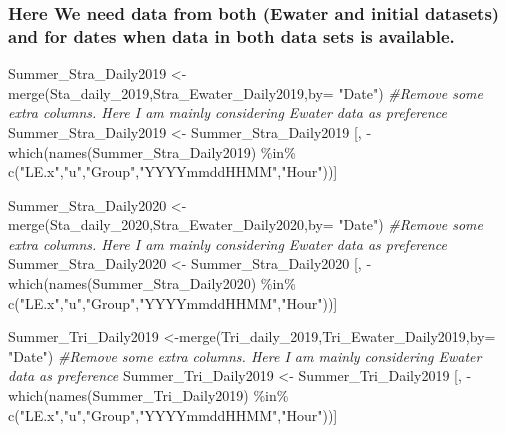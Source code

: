 \documentclass[
]{article}
\newenvironment{Shaded}{\begin{snugshade}}{\end{snugshade}}
\newcommand{\AttributeTok}[1]{\textcolor[rgb]{0.77,0.63,0.00}{#1}}
\newcommand{\CommentTok}[1]{\textcolor[rgb]{0.56,0.35,0.01}{\textit{#1}}}
\newcommand{\FunctionTok}[1]{\textcolor[rgb]{0.00,0.00,0.00}{#1}}
\newcommand{\NormalTok}[1]{#1}
\newcommand{\OtherTok}[1]{\textcolor[rgb]{0.56,0.35,0.01}{#1}}
\newcommand{\SpecialCharTok}[1]{\textcolor[rgb]{0.00,0.00,0.00}{#1}}
\newcommand{\StringTok}[1]{\textcolor[rgb]{0.31,0.60,0.02}{#1}}
\begin{document}
\hypertarget{here-we-need-data-from-both-ewater-and-initial-datasets-and-for-dates-when-data-in-both-data-sets-is-available.}{%
\subsubsection{Here We need data from both (Ewater and initial datasets)
and for dates when data in both data sets is
available.}\label{here-we-need-data-from-both-ewater-and-initial-datasets-and-for-dates-when-data-in-both-data-sets-is-available.}}

\begin{Shaded}
\begin{Highlighting}[]
\NormalTok{Summer\_Stra\_Daily2019 }\OtherTok{\textless{}{-}}\FunctionTok{merge}\NormalTok{(Sta\_daily\_2019,Stra\_Ewater\_Daily2019,}\AttributeTok{by=} \StringTok{"Date"}\NormalTok{)}
\CommentTok{\#Remove some extra columns. Here I am mainly considering Ewater data as preference}
\NormalTok{Summer\_Stra\_Daily2019 }\OtherTok{\textless{}{-}}\NormalTok{ Summer\_Stra\_Daily2019 [, }\SpecialCharTok{{-}}\FunctionTok{which}\NormalTok{(}\FunctionTok{names}\NormalTok{(Summer\_Stra\_Daily2019) }\SpecialCharTok{\%in\%} \FunctionTok{c}\NormalTok{(}\StringTok{"LE.x"}\NormalTok{,}\StringTok{"u"}\NormalTok{,}\StringTok{"Group"}\NormalTok{,}\StringTok{"YYYYmmddHHMM"}\NormalTok{,}\StringTok{"Hour"}\NormalTok{))]}

\NormalTok{Summer\_Stra\_Daily2020 }\OtherTok{\textless{}{-}}\FunctionTok{merge}\NormalTok{(Sta\_daily\_2020,Stra\_Ewater\_Daily2020,}\AttributeTok{by=} \StringTok{"Date"}\NormalTok{)}
\CommentTok{\#Remove some extra columns. Here I am mainly considering Ewater data as preference}
\NormalTok{Summer\_Stra\_Daily2020 }\OtherTok{\textless{}{-}}\NormalTok{ Summer\_Stra\_Daily2020 [, }\SpecialCharTok{{-}}\FunctionTok{which}\NormalTok{(}\FunctionTok{names}\NormalTok{(Summer\_Stra\_Daily2020) }\SpecialCharTok{\%in\%} \FunctionTok{c}\NormalTok{(}\StringTok{"LE.x"}\NormalTok{,}\StringTok{"u"}\NormalTok{,}\StringTok{"Group"}\NormalTok{,}\StringTok{"YYYYmmddHHMM"}\NormalTok{,}\StringTok{"Hour"}\NormalTok{))]}

\NormalTok{Summer\_Tri\_Daily2019 }\OtherTok{\textless{}{-}}\FunctionTok{merge}\NormalTok{(Tri\_daily\_2019,Tri\_Ewater\_Daily2019,}\AttributeTok{by=} \StringTok{"Date"}\NormalTok{)}
\CommentTok{\#Remove some extra columns. Here I am mainly considering Ewater data as preference}
\NormalTok{Summer\_Tri\_Daily2019 }\OtherTok{\textless{}{-}}\NormalTok{ Summer\_Tri\_Daily2019 [, }\SpecialCharTok{{-}}\FunctionTok{which}\NormalTok{(}\FunctionTok{names}\NormalTok{(Summer\_Tri\_Daily2019) }\SpecialCharTok{\%in\%} \FunctionTok{c}\NormalTok{(}\StringTok{"LE.x"}\NormalTok{,}\StringTok{"u"}\NormalTok{,}\StringTok{"Group"}\NormalTok{,}\StringTok{"YYYYmmddHHMM"}\NormalTok{,}\StringTok{"Hour"}\NormalTok{))]}


\end{Highlighting}
\end{Shaded}
\end{document}
